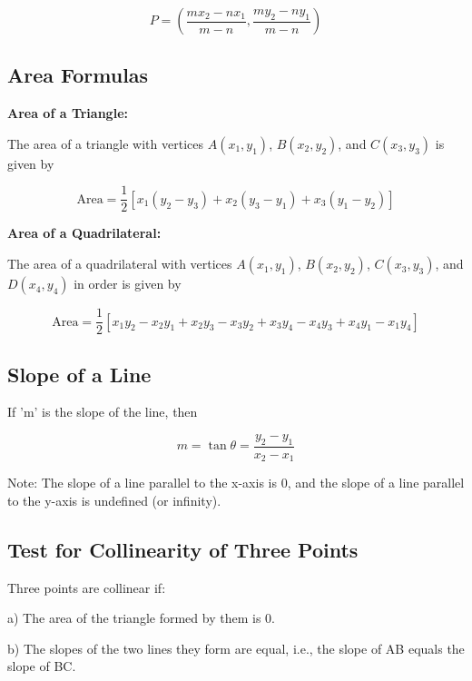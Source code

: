 \documentclass{article}
\begin{document}
\begin{equation}
P = \left(\frac{m x_2 - n x_1}{m - n}, \frac{m y_2 - n y_1}{m - n}\right)
\end{equation}

\subsection{Area Formulas}

\textbf{Area of a Triangle:}

The area of a triangle with vertices \(A(x_1, y_1)\), \(B(x_2, y_2)\), and \(C(x_3, y_3)\) is given by

\begin{equation}
\text{Area} = \frac{1}{2} [x_1(y_2 - y_3) + x_2 (y_3 - y_1) + x_3 (y_1 - y_2)]
\end{equation}

\textbf{Area of a Quadrilateral:}

The area of a quadrilateral with vertices \(A(x_1, y_1)\), \(B(x_2, y_2)\), \(C(x_3, y_3)\), and \(D(x_4, y_4)\) in order is given by

\begin{equation}
\text{Area} = \frac{1}{2} [x_1y_2 - x_2y_1 + x_2y_3 - x_3y_2 + x_3y_4 - x_4y_3 + x_4y_1 - x_1y_4]
\end{equation}

\subsection{Slope of a Line}

If 'm' is the slope of the line, then

\begin{equation}
m = \tan \theta = \frac{y_2 - y_1}{x_2 - x_1}
\end{equation}

Note: The slope of a line parallel to the x-axis is 0, and the slope of a line parallel to the y-axis is undefined (or infinity).

\subsection{Test for Collinearity of Three Points}

Three points are collinear if:

a) The area of the triangle formed by them is 0.

b) The slopes of the two lines they form are equal, i.e., the slope of AB equals the slope of BC.
\end{document}
